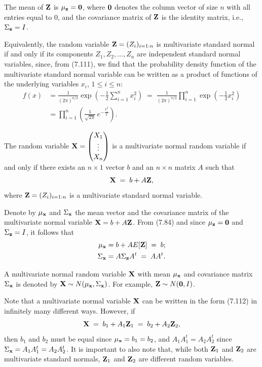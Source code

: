 The mean of $\mathbf{Z}$ is $\mu_{\mathbf{z}} = \mathbf{0}$, where $\mathbf{0}$ denotes the column vector of size
$n$ with all entries equal to $0$, and the covariance matrix of $\mathbf{Z}$ is the identity matrix,
i.e., $\Sigma_{\mathbf{z}} = I$.

Equivalently, the random variable $\mathbf{Z}=(Z_i)_{i=1:n}$ is multivariate standard normal if and
only if its components $Z_1, Z_2, \ldots, Z_n$ are independent standard normal variables, since,
from (7.111), we find that the probability density function of the multivariate standard normal
variable can be written as a product of functions of the underlying variables $x_i$, $1\le i\le
n$:
\begin{align*}
f(x) &= \frac{1}{(2\pi)^{n/2}}\exp\!\left(-\frac12\sum_{i=1}^n x_i^2\right)
\;=\; \frac{1}{(2\pi)^{n/2}}\prod_{i=1}^n\exp\!\left(-\frac12 x_i^2\right) \\
&= \prod_{i=1}^n\left(\frac{1}{\sqrt{2\pi}}\,e^{-\frac{x_i^2}{2}}\right).
\end{align*}

\begin{definition}
The random variable $\mathbf{X} = \begin{pmatrix} X_1 \\ \vdots \\ X_n \end{pmatrix}$ is a
multivariate normal random variable if and only if there exists an $n\times1$ vector $b$ and an
$n\times n$ matrix $A$ such that
\begin{equation}
\mathbf{X} \;=\; b + A\mathbf{Z},
\end{equation}
where $\mathbf{Z}=(Z_i)_{i=1:n}$ is a multivariate standard normal variable.
\end{definition}

Denote by $\mu_{\mathbf{x}}$ and $\Sigma_{\mathbf{x}}$ the mean vector and the covariance matrix of the
multivariate normal variable $\mathbf{X} = b+A\mathbf{Z}$. From (7.84) and since $\mu_{\mathbf{z}}=\mathbf{0}$ and
$\Sigma_{\mathbf{z}}=I$, it follows that
\begin{align*}
\mu_{\mathbf{x}} &= b + AE\!\left[\mathbf{Z}\right] \;=\; b; \\
\Sigma_{\mathbf{x}} &= A\Sigma_{\mathbf{z}}A^t \;=\; AA^t.
\end{align*}

A multivariate normal random variable $\mathbf{X}$ with mean $\mu_{\mathbf{x}}$ and covariance matrix
$\Sigma_{\mathbf{x}}$ is denoted by $\mathbf{X}\sim N(\mu_{\mathbf{x}},\Sigma_{\mathbf{x}})$. For example, $\mathbf{Z}\sim
N(\mathbf{0},I)$.

Note that a multivariate normal variable $\mathbf{X}$ can be written in the form (7.112) in
infinitely many different ways. However, if
\[
\mathbf{X} \;=\; b_1 + A_1\mathbf{Z}_1 \;=\; b_2 + A_2\mathbf{Z}_2,
\]
then $b_1$ and $b_2$ must be equal since $\mu_{\mathbf{x}} = b_1 = b_2$, and $A_1A_1^t = A_2A_2^t$
since $\Sigma_{\mathbf{x}} = A_1A_1^t = A_2A_2^t$. It is important to also note that, while both
$\mathbf{Z}_1$ and $\mathbf{Z}_2$ are multivariate standard normals, $\mathbf{Z}_1$ and $\mathbf{Z}_2$ are different
random variables.

